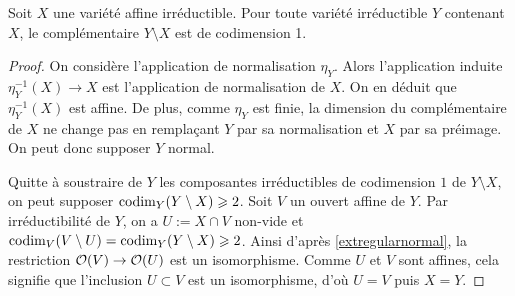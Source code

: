 \begin{prop}\label{codimaffinenormal}
Soit $X$ une variété affine irréductible. Pour toute variété irréductible $Y$ contenant $X$, le complémentaire $Y\setminus X$ est de codimension 1.
\end{prop}
\begin{proof}
On considère l'application de normalisation $\eta_Y$. Alors l'application induite $\eta_Y^{-1}(X)\rightarrow X$ est l'application de normalisation de $X$. On en déduit que $\eta_Y^{-1}(X)$ est affine. De plus, comme $\eta_Y$ est finie, la dimension du complémentaire de $X$ ne change pas en remplaçant $Y$ par sa normalisation et $X$ par sa préimage. On peut donc supposer $Y$ normal.

Quitte à soustraire de $Y$ les composantes irréductibles de codimension $1$ de $Y\setminus X$, on peut supposer $\operatorname{codim}_Y(Y\setminus X)\geqslant 2$. Soit $V$ un ouvert affine de $Y$. Par irréductibilité de $Y$, on a $U:=X\cap V$ non-vide et $\operatorname{codim}_V(V\setminus U)=\operatorname{codim}_Y(Y\setminus X)\geqslant 2$. Ainsi d'après \ref{extregularnormal}, la restriction $\mathcal{O}(V)\rightarrow \mathcal{O}(U)$ est un isomorphisme. Comme $U$ et $V$ sont affines, cela signifie que l'inclusion $U\subset V$ est un isomorphisme, d'où $U=V$ puis $X=Y$.
\end{proof}


